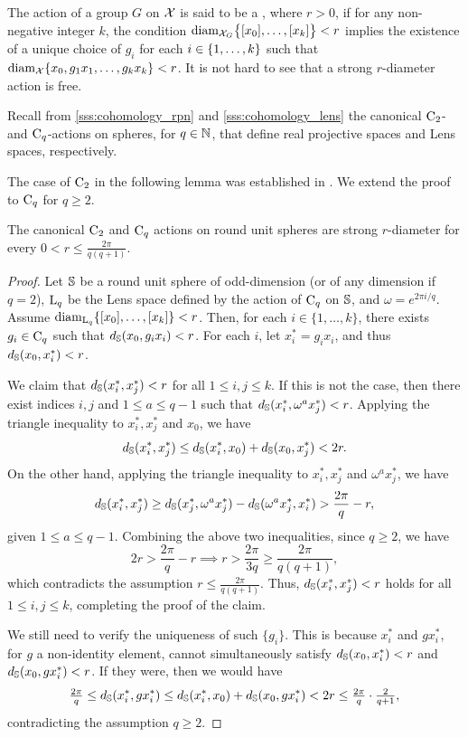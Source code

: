 \subsubsection{}\label{sss:strong_r_action}

The action of a group $G$ on $\cX$ is said to be a , where $r > 0$, if for any non-negative integer $k$, the condition $\diam_{\cX_G}\set[\big]{[x_0],\dots,[x_k]} < r$ implies the existence of a unique choice of $g_i$ for each $i \in \set{1,\dots,k}$ such that $\diam_{\cX}\set{x_0, g_1x_1, \dots, g_kx_k} < r$.
It is not hard to see that a strong $r$-diameter action is free.

Recall from \cref{sss:cohomology_rpn} and \cref{sss:cohomology_lens} the canonical $\cyc_2$- and $\cyc_q$-actions on spheres, for $q \in \N$, that define real projective spaces and Lens spaces, respectively.

The case of $\cyc_2$ in the following lemma was established in \cite[Corollary~4.3]{adams2022metric}.
We extend the proof to $\cyc_q$ for \(q \geq 2\).

\lemma
The canonical $\cyc_2$ and $\cyc_q$ actions on round unit spheres are strong $r$-diameter for every $0 < r \leq \tfrac{2\pi}{q(q+1)}$.

\begin{proof}
	Let $\bS$ be a round unit sphere of odd-dimension (or of any dimension if $q=2$), $\rL_q$ be the Lens space defined by the action of \(\cyc_q\) on \(\bS\), and $\omega = e^{2\pi i/q}$.
	Assume $\diam_{\rL_q}\{[x_0], \dots, [x_k]\} < r$.
	Then, for each $i \in \{1, \dots, k\}$, there exists $g_i \in \cyc_q$ such that $d_{\bS}(x_0, g_i x_i) < r$. For each $i$, let $x_i^* = g_i x_i$, and thus $d_{\bS}(x_0, x_i^*) < r$.

	We claim that $d_{\bS}(x_i^*, x_j^*) < r$ for all $1 \le i,j \le k$.
	If this is not the case, then there exist indices $i,j$ and $1 \leq a \leq q-1$ such that $d_{\bS}(x_i^*, \omega^a x_j^*) < r$.
	Applying the triangle inequality to $x_i^*, x_j^*$ and $x_0$, we have
	\[d_{\bS}(x_i^*, x_j^*) \leq d_{\bS}(x_i^*, x_0) + d_{\bS}(x_0, x_j^*) < 2r.\]
	On the other hand, applying the triangle inequality to $x_i^*, x_j^*$ and $\omega^a x_j^*$, we have
	\[
	d_{\bS}(x_i^*, x_j^*) \geq d_{\bS}(x_j^*, \omega^a x_j^*) - d_{\bS}(\omega^a x_j^*, x_i^*) > \frac{2\pi}{q} - r,
	\]
	given $1 \leq a \leq q-1$.
	Combining the above two inequalities, since $q \geq 2$, we have
	\[
	2r > \frac{2\pi}{q} - r \implies r > \frac{2\pi}{3q} \geq \frac{2\pi}{q(q+1)},
	\]
	which contradicts the assumption $r \le \frac{2\pi}{q(q+1)}$.
	Thus, $d_{\bS}(x_i^*, x_j^*) < r$ holds for all $1 \le i,j \le k$, completing the proof of the claim.

	We still need to verify the uniqueness of such $\{g_i\}$.
	This is because $x_i^*$ and $gx_i^*$, for $g$ a non-identity element, cannot simultaneously satisfy $d_{\bS}(x_0, x_i^*) < r$ and $d_{\bS}(x_0, gx_i^*) < r$.
	If they were, then we would have
	\[\tfrac{2\pi}{q} \leq d_{\bS}(x_i^*, gx_i^*) \leq d_{\bS}(x_i^*, x_0) + d_{\bS}(x_0, gx_i^*) < 2r \leq \tfrac{2\pi}{q} \cdot \tfrac{2}{q+1},
	\]
	contradicting the assumption $q \geq 2$.
\end{proof}

